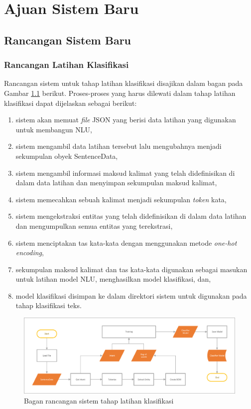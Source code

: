 \chapter{Ajuan Sistem Baru}

\section{Rancangan Sistem Baru}

\subsection{Rancangan Latihan Klasifikasi}

Rancangan sistem untuk tahap latihan klasifikasi disajikan dalam bagan pada Gambar \ref{fig:design_training} berikut. Proses-proses yang harus dilewati dalam tahap latihan klasifikasi dapat dijelaskan sebagai berikut:

\begin{enumerate}
	\item sistem akan memuat \textit{file} JSON yang berisi data latihan yang digunakan untuk membangun NLU,
	\item sistem mengambil data latihan tersebut lalu mengubahnya menjadi sekumpulan obyek SentenceData,
	\item sistem mengambil informasi maksud kalimat yang telah didefinisikan di dalam data latihan dan menyimpan sekumpulan maksud kalimat,
	\item sistem memecahkan sebuah kalimat menjadi sekumpulan \textit{token} kata,
	\item sistem mengekstraksi entitas yang telah didefinisikan di dalam data latihan dan mengumpulkan semua entitas yang terekstrasi,
	\item sistem menciptakan tas kata-kata dengan menggunakan metode \textit{one-hot encoding},
	\item sekumpulan maksud kalimat dan tas kata-kata digunakan sebagai masukan untuk latihan model NLU, menghasilkan model klasifikasi, dan,
	\item model klasifikasi disimpan ke dalam direktori sistem untuk digunakan pada tahap klasifikasi teks.
\end{enumerate}

\begin{figure}[H]
	\centering
	\includegraphics[width=\textwidth, trim=2 2 2 2, clip]{resources/4-design_training.pdf}
	\caption{Bagan rancangan sistem tahap latihan klasifikasi}
	\label{fig:design_training}
\end{figure}

